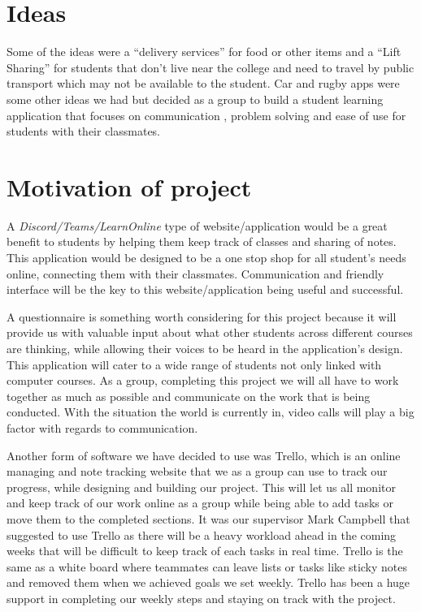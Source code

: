 \section{Ideas}
Some of the ideas were a “delivery services” for food or other items and a “Lift Sharing” for students that don’t live near the college and need to travel by public transport which may not be available to the student. 
Car and rugby apps were some other ideas we had but decided as a group to build a student learning application that focuses on communication , problem solving and ease of use for students with their classmates. 

\section{Motivation of project}
A \textit{Discord/Teams/LearnOnline} type of website/application would be a great benefit to students by helping them keep track of classes and sharing of notes. This application would be designed to be a one stop shop for all student’s needs online, connecting them with their classmates. Communication and friendly interface will be the key to this website/application being useful and successful.\hfill \break

A questionnaire is something worth considering for this project because it will provide us with valuable input about what other students across different courses are thinking, while allowing their voices to be heard in the application's design. This application will cater to a wide range of students not only linked with computer courses.
As a group, completing this project we will all have to work together as much as possible and communicate on the work that is being conducted. With the situation the world is currently in, video calls will play a big factor with regards to communication.\hfill \break

Another form of software we have decided to use was Trello\cite{ref9}, which is an online managing and note tracking website that we as a group can use to track our progress, while designing and building our project. This will let us all monitor and keep track of our work online as a group while being able to add tasks or move them to the completed sections. 
It was our supervisor Mark Campbell that suggested to use Trello as there will be a heavy workload ahead in the coming weeks that will be difficult to keep track of each tasks in real time. Trello is the same as a white board where teammates can leave lists or tasks like sticky notes and removed them when we achieved goals we set weekly. Trello has been a huge support in completing our weekly steps and staying on track with the project.\hfill \break


